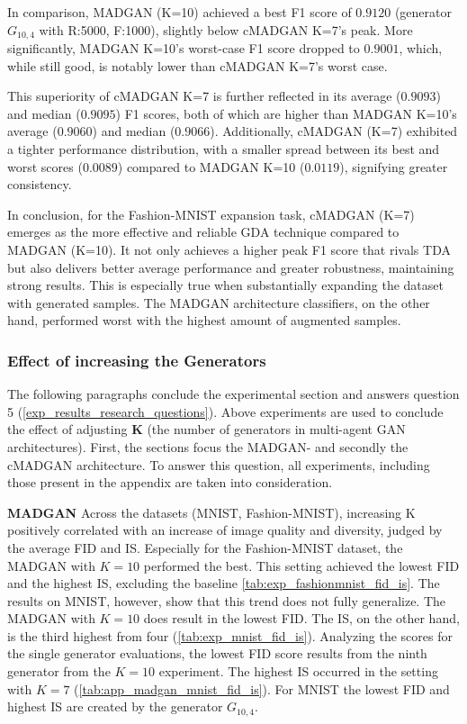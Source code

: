 In comparison, MADGAN (K=10) achieved a best F1 score of $0.9120$ (generator \(G_{10,4}\) with R:5000, F:1000), slightly below cMADGAN K=7's peak. More significantly, MADGAN K=10's worst-case F1 score dropped to $0.9001$, which, while still good, is notably lower than cMADGAN K=7's worst case.

This superiority of cMADGAN K=7 is further reflected in its average ($0.9093$) and median ($0.9095$) F1 scores, both of which are higher than MADGAN K=10's average ($0.9060$) and median ($0.9066$). Additionally, cMADGAN (K=7) exhibited a tighter performance distribution, with a smaller spread between its best and worst scores ($0.0089$) compared to MADGAN K=10 ($0.0119$), signifying greater consistency.

In conclusion, for the Fashion-MNIST expansion task, cMADGAN (K=7) emerges as the more effective and reliable GDA technique compared to MADGAN (K=10). It not only achieves a higher peak F1 score that rivals TDA but also delivers better average performance and greater robustness, maintaining strong results. This is especially true when substantially expanding the dataset with generated samples. The MADGAN architecture classifiers, on the other hand, performed worst with the highest amount of augmented samples.

\subsubsection[Question 5]{Effect of increasing the Generators}            \label{exp_results_ans_q5}
The following paragraphs conclude the experimental section and answers question 5 (\ref{exp_results_research_questions}). Above experiments are used to conclude the effect of adjusting \textbf{K} (the number of generators in multi-agent GAN architectures). First, the sections focus the MADGAN- and secondly the cMADGAN architecture. To answer this question, all experiments, including those present in the appendix are taken into consideration.


\noindent\textbf{MADGAN}
Across the datasets (MNIST, Fashion-MNIST), increasing K positively correlated with an increase of image quality and diversity, judged by the average FID and IS. Especially for the Fashion-MNIST dataset, the MADGAN with $K=10$ performed the best. This setting achieved the lowest FID and the highest IS, excluding the baseline \ref{tab:exp_fashionmnist_fid_is}. The results on MNIST, however, show that this trend does not fully generalize. The MADGAN with $K=10$ does result in the lowest FID. The IS, on the other hand, is the third highest from four (\ref{tab:exp_mnist_fid_is}). Analyzing the scores for the single generator evaluations, the lowest FID score results from the ninth generator from the $K=10$ experiment. The highest IS occurred in the setting with $K=7$ (\ref{tab:app_madgan_mnist_fid_is}). For MNIST the lowest FID and highest IS are created by the generator \(G_{10,4}\).


